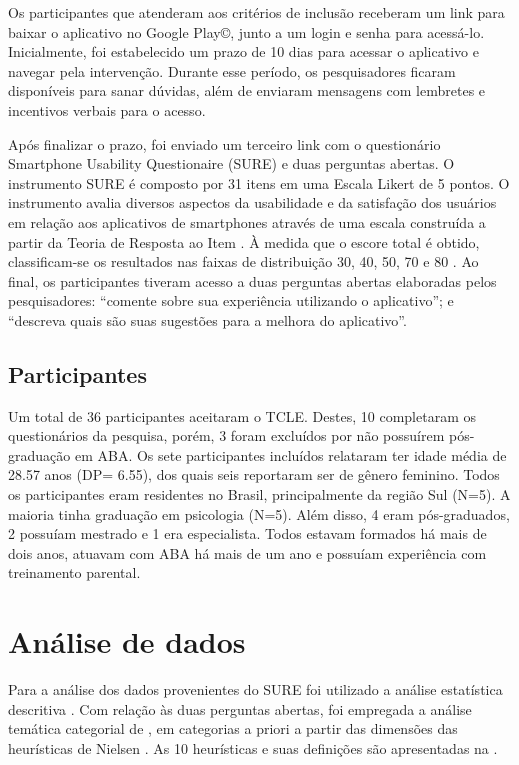 \documentclass[portuguese]{textolivre}
\begin{document}
Os participantes que atenderam aos critérios de inclusão receberam um link para baixar o aplicativo no Google Play©, junto a um login e senha para acessá-lo. Inicialmente, foi estabelecido um prazo de 10 dias para acessar o aplicativo e navegar pela intervenção. Durante esse período, os pesquisadores ficaram disponíveis para sanar dúvidas, além de enviaram mensagens com lembretes e incentivos verbais para o acesso.

Após finalizar o prazo, foi enviado um terceiro link com o questionário Smartphone Usability Questionaire (SURE) e duas perguntas abertas. O instrumento SURE é composto por 31 itens em uma Escala Likert de 5 pontos. O instrumento avalia diversos aspectos da usabilidade e da satisfação dos usuários em relação aos aplicativos de smartphones através de uma escala construída a partir da Teoria de Resposta ao Item \cite{wangenheim2014sure}. À medida que o escore total é obtido, classificam-se os resultados nas faixas de distribuição 30, 40, 50, 70 e 80 \cite{wangenheim2014sure}. Ao final, os participantes tiveram acesso a duas perguntas abertas elaboradas pelos pesquisadores: “comente sobre sua experiência utilizando o aplicativo”; e “descreva quais são suas sugestões para a melhora do aplicativo”.


\subsection{Participantes}\label{sec-formato}
Um total de 36 participantes aceitaram o TCLE. Destes, 10 completaram os questionários da pesquisa, porém, 3 foram excluídos por não possuírem pós-graduação em ABA. Os sete participantes incluídos relataram ter idade média de 28.57 anos (DP= 6.55), dos quais seis reportaram ser de gênero feminino. Todos os participantes eram residentes no Brasil, principalmente da região Sul (N=5). A maioria tinha graduação em psicologia (N=5). Além disso, 4 eram pós-graduados, 2 possuíam mestrado e 1 era especialista. Todos estavam formados há mais de dois anos, atuavam com ABA há mais de um ano e possuíam experiência com treinamento parental.


\section{Análise de dados}\label{sec-modelo}
Para a análise dos dados provenientes do SURE foi utilizado a análise estatística descritiva \cite{dancey2019estatistica}. Com relação às duas perguntas abertas, foi empregada a análise temática categorial de \textcite{bardin2011analise}, em categorias a priori a partir das dimensões das heurísticas de Nielsen \cite{nielsen1995heuristics}. As 10 heurísticas e suas definições são apresentadas na .
\end{document}
